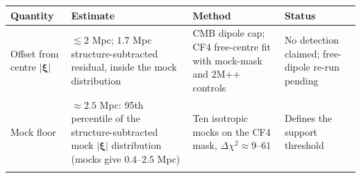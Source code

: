 \documentclass[
]{article}
\begin{document}
\begin{longtable}[]{@{}llll@{}}
\toprule
\begin{minipage}[b]{0.22\columnwidth}\raggedright
Quantity\strut
\end{minipage} & \begin{minipage}[b]{0.22\columnwidth}\raggedright
Estimate\strut
\end{minipage} & \begin{minipage}[b]{0.22\columnwidth}\raggedright
Method\strut
\end{minipage} & \begin{minipage}[b]{0.22\columnwidth}\raggedright
Status\strut
\end{minipage}\tabularnewline
\midrule
\endhead
\begin{minipage}[t]{0.22\columnwidth}\raggedright
Offset from centre \(|\boldsymbol{\xi}|\)\strut
\end{minipage} & \begin{minipage}[t]{0.22\columnwidth}\raggedright
\(\lesssim 2\) Mpc; \(1.7\) Mpc structure-subtracted residual, inside
the mock distribution\strut
\end{minipage} & \begin{minipage}[t]{0.22\columnwidth}\raggedright
CMB dipole cap; CF4 free-centre fit with mock-mask and 2M++
controls\strut
\end{minipage} & \begin{minipage}[t]{0.22\columnwidth}\raggedright
No detection claimed; free-dipole re-run pending\strut
\end{minipage}\tabularnewline
\begin{minipage}[t]{0.22\columnwidth}\raggedright
Mock floor\strut
\end{minipage} & \begin{minipage}[t]{0.22\columnwidth}\raggedright
\(\approx 2.5\) Mpc: 95th percentile of the structure-subtracted mock
\(|\boldsymbol{\xi}|\) distribution (mocks give \(0.4\)--\(2.5\)
Mpc)\strut
\end{minipage} & \begin{minipage}[t]{0.22\columnwidth}\raggedright
Ten isotropic mocks on the CF4 mask,
\(\Delta\chi^2 \approx 9\)--\(61\)\strut
\end{minipage} & \begin{minipage}[t]{0.22\columnwidth}\raggedright
Defines the support threshold\strut
\end{minipage}\tabularnewline
\begin{minipage}[t]{0.22\columnwidth}\raggedright

\end{minipage}
\end{longtable}
\end{document}
